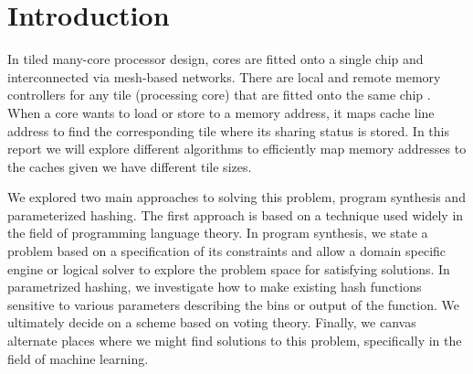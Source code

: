 \section{Introduction}
\label{sec:Introduction}

In tiled many-core processor design, cores are fitted onto a single chip and
interconnected via mesh-based networks. There are local and remote memory
controllers for any tile (processing core) that are fitted onto the same chip
\cite{tiled-manycore}. When a core wants to load or store to a memory address,
it maps cache line address to find the corresponding tile where its sharing
status is stored. In this report we will explore different algorithms to
efficiently map memory addresses to the caches given we have different tile
sizes.

We explored two main approaches to solving this problem, program synthesis and
parameterized hashing.  The first approach is based on a technique used widely
in the field of programming language theory.  In program synthesis, we state a
problem based on a specification of its constraints and allow a domain specific
engine or logical solver to explore the problem space for satisfying solutions.
In parametrized hashing, we investigate how to make existing hash functions
sensitive to various parameters describing the bins or output of the function.
We ultimately decide on a scheme based on voting theory. Finally, we canvas
alternate places where we might find solutions to this problem, specifically in
the field of machine learning.
